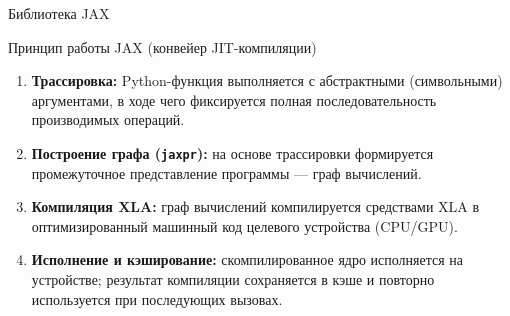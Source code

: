 \documentclass[ignoreonframetext,unicode,aspectratio=169]{beamer}
\begin{document}
\begin{frame}{Библиотека JAX}
	\begin{block}{Принцип работы JAX (конвейер JIT-компиляции)}
		\small
		\begin{enumerate}\itemsep2pt
			\item \textbf{Трассировка:} Python-функция выполняется с абстрактными (символьными) аргументами, в ходе чего фиксируется полная последовательность производимых операций.
			\item \textbf{Построение графа (\texttt{jaxpr}):} на основе трассировки формируется промежуточное представление программы --- граф вычислений.
			\item \textbf{Компиляция XLA:} граф вычислений компилируется средствами XLA в оптимизированный машинный код целевого устройства (CPU/GPU).
			\item \textbf{Исполнение и кэширование:} скомпилированное ядро исполняется на устройстве; результат компиляции сохраняется в кэше и повторно используется при последующих вызовах.
		\end{enumerate}
	\end{block}
\end{frame}

%
\end{document}
